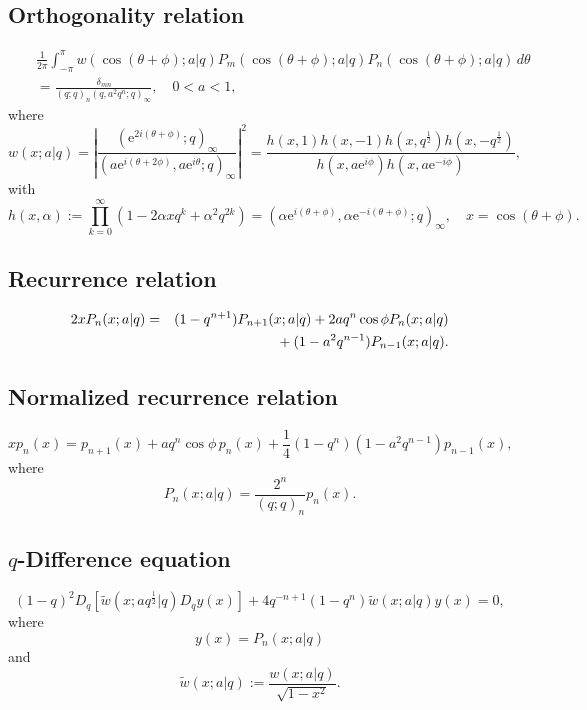 \documentclass[envcountchap,graybox]{svmono}
\newcommand{\mathindent}{\hspace{7.5mm}}
\newcommand{\e}{\textrm{e}}
\begin{document}
\subsection*{Orthogonality relation}
\begin{eqnarray}
\label{OrtqMP}
& &\frac{1}{2\pi}\int_{-\pi}^{\pi}w(\cos(\theta+\phi);a|q)
P_m(\cos(\theta+\phi);a|q)P_n(\cos(\theta+\phi);a|q)\,d\theta\nonumber\\
& &{}=\frac{\,\delta_{mn}}{(q;q)_n(q,a^2q^n;q)_{\infty}},\quad 0<a<1,
\end{eqnarray}
where
$$w(x;a|q)=\left|\frac{(\e^{2i(\theta+\phi)};q)_{\infty}}
{(a\e^{i(\theta+2\phi)},a\e^{i\theta};q)_{\infty}}\right|^2=
\frac{h(x,1)h(x,-1)h(x,q^{\frac{1}{2}})h(x,-q^{\frac{1}{2}})}
{h(x,a\e^{i\phi})h(x,a\e^{-i\phi})},$$
with
$$h(x,\alpha):=\prod_{k=0}^{\infty}\left(1-2\alpha xq^k+\alpha^2q^{2k}\right)
=\left(\alpha\e^{i(\theta+\phi)},\alpha\e^{-i(\theta+\phi)};q\right)_{\infty},
\quad x=\cos(\theta+\phi).$$

\subsection*{Recurrence relation}
\begin{eqnarray}
\label{RecqMP}
2xP_n(x;a|q)&=&(1-q^{n+1})P_{n+1}(x;a|q)+2aq^n\cos\phi P_n(x;a|q)\nonumber\\
& &{}\mathindent{}+(1-a^2q^{n-1})P_{n-1}(x;a|q).
\end{eqnarray}

\newpage

\subsection*{Normalized recurrence relation}
\begin{equation}
\label{NormRecqMP}
xp_n(x)=p_{n+1}(x)+aq^n\cos\phi\,p_n(x)+\frac{1}{4}(1-q^n)(1-a^2q^{n-1})p_{n-1}(x),
\end{equation}
where
$$P_n(x;a|q)=\frac{2^n}{(q;q)_n}p_n(x).$$

\subsection*{$q$-Difference equation}
\begin{equation}
\label{dvqMP}
(1-q)^2D_q\left[{\tilde w}(x;aq^{\frac{1}{2}}|q)D_qy(x)\right]
+4q^{-n+1}(1-q^n){\tilde w}(x;a|q)y(x)=0,
\end{equation}
where
$$y(x)=P_n(x;a|q)$$
and
$${\tilde w}(x;a|q):=\frac{w(x;a|q)}{\sqrt{1-x^2}}.$$
\end{document}
